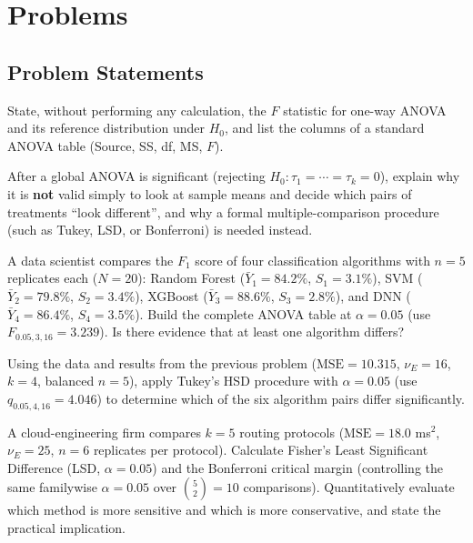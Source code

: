 \section*{Problems}

\subsection*{Problem Statements}

\begin{problema}
\label{prob:83dd109}
State, without performing any calculation, the $F$ statistic for one-way ANOVA and its reference distribution under $H_0$, and list the columns of a standard ANOVA table (Source, SS, df, MS, $F$).
\end{problema}

\begin{problema}
\label{prob:e959af7}
After a global ANOVA is significant (rejecting $H_0:\tau_1=\cdots=\tau_k=0$), explain why it is \textbf{not} valid simply to look at sample means and decide which pairs of treatments ``look different'', and why a formal multiple-comparison procedure (such as Tukey, LSD, or Bonferroni) is needed instead.
\end{problema}

\begin{problema}
\label{prob:acbf3f9}
A data scientist compares the $F_1$ score of four classification algorithms with $n=5$ replicates each ($N=20$): Random Forest ($\bar Y_1=84.2\%$, $S_1=3.1\%$), SVM ($\bar Y_2=79.8\%$, $S_2=3.4\%$), XGBoost ($\bar Y_3=88.6\%$, $S_3=2.8\%$), and DNN ($\bar Y_4=86.4\%$, $S_4=3.5\%$). Build the complete ANOVA table at $\alpha=0.05$ (use $F_{0.05,3,16}=3.239$). Is there evidence that at least one algorithm differs?
\end{problema}

\begin{problema}
\label{prob:63c8eaa}
Using the data and results from the previous problem ($\text{MSE}=10.315$, $\nu_E=16$, $k=4$, balanced $n=5$), apply Tukey's HSD procedure with $\alpha=0.05$ (use $q_{0.05,4,16}=4.046$) to determine which of the six algorithm pairs differ significantly.
\end{problema}

\begin{problema}
\label{prob:271e3ee}
A cloud-engineering firm compares $k=5$ routing protocols ($\text{MSE}=18.0$ ms$^2$, $\nu_E=25$, $n=6$ replicates per protocol). Calculate Fisher's Least Significant Difference (LSD, $\alpha=0.05$) and the Bonferroni critical margin (controlling the same familywise $\alpha=0.05$ over $\binom{5}{2}=10$ comparisons). Quantitatively evaluate which method is more sensitive and which is more conservative, and state the practical implication.
\end{problema}

